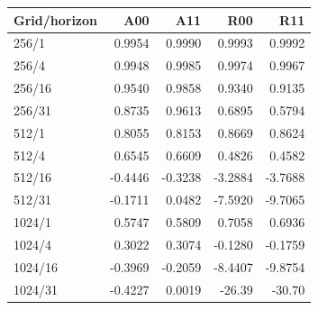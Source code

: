 \begin{tabular}{lrrrr}
\toprule
Grid/horizon & A00 & A11 & R00 & R11 \\
\midrule
256/1 & 0.9954 & 0.9990 & 0.9993 & 0.9992 \\
256/4 & 0.9948 & 0.9985 & 0.9974 & 0.9967 \\
256/16 & 0.9540 & 0.9858 & 0.9340 & 0.9135 \\
256/31 & 0.8735 & 0.9613 & 0.6895 & 0.5794 \\
512/1 & 0.8055 & 0.8153 & 0.8669 & 0.8624 \\
512/4 & 0.6545 & 0.6609 & 0.4826 & 0.4582 \\
512/16 & -0.4446 & -0.3238 & -3.2884 & -3.7688 \\
512/31 & -0.1711 & 0.0482 & -7.5920 & -9.7065 \\
1024/1 & 0.5747 & 0.5809 & 0.7058 & 0.6936 \\
1024/4 & 0.3022 & 0.3074 & -0.1280 & -0.1759 \\
1024/16 & -0.3969 & -0.2059 & -8.4407 & -9.8754 \\
1024/31 & -0.4227 & 0.0019 & -26.39 & -30.70 \\
\bottomrule
\end{tabular}
